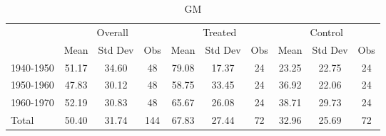 \begin{table}[htbp]\centering
\def\sym#1{\ifmmode^{#1}\else\(^{#1}\)\fi}
\caption{GM \label{tab1}}
\begin{tabular}{l*{3}{ccc}}
\toprule
                    &\multicolumn{3}{c}{Overall}           &\multicolumn{3}{c}{Treated}           &\multicolumn{3}{c}{Control}           \\
                    &        Mean&     Std Dev&         Obs&        Mean&     Std Dev&         Obs&        Mean&     Std Dev&         Obs\\
\midrule
1940-1950           &       51.17&       34.60&          48&       79.08&       17.37&          24&       23.25&       22.75&          24\\
1950-1960           &       47.83&       30.12&          48&       58.75&       33.45&          24&       36.92&       22.06&          24\\
1960-1970           &       52.19&       30.83&          48&       65.67&       26.08&          24&       38.71&       29.73&          24\\
Total               &       50.40&       31.74&         144&       67.83&       27.44&          72&       32.96&       25.69&          72\\
\bottomrule
\end{tabular}
\end{table}
